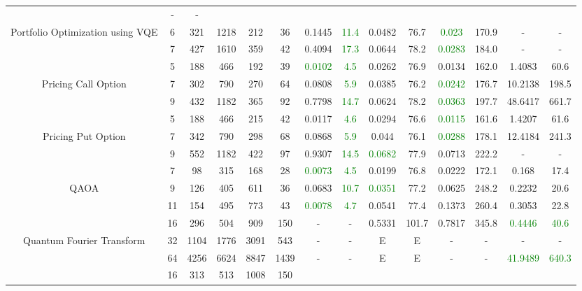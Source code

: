 \begin{table}[htb]
{\begin{tabular}{|c|c|c|c|c|c|c|c|c|c|c|c|c|c|}
 & - & -
 \\
Portfolio Optimization using VQE & 
6 & 321 & 1218 & 212 & 36
 & 0.1445 & \textcolor{green}{11.4}
 & 0.0482 & 76.7
 & \textcolor{green}{0.023} & 170.9
 & - & -
 \\
 & 
7 & 427 & 1610 & 359 & 42
 & 0.4094 & \textcolor{green}{17.3}
 & 0.0644 & 78.2
 & \textcolor{green}{0.0283} & 184.0
 & - & -
 \\
\hline
 & 
5 & 188 & 466 & 192 & 39
 & \textcolor{green}{0.0102} & \textcolor{green}{4.5}
 & 0.0262 & 76.9
 & 0.0134 & 162.0
 & 1.4083 & 60.6
 \\
Pricing Call Option & 
7 & 302 & 790 & 270 & 64
 & 0.0808 & \textcolor{green}{5.9}
 & 0.0385 & 76.2
 & \textcolor{green}{0.0242} & 176.7
 & 10.2138 & 198.5
 \\
 & 
9 & 432 & 1182 & 365 & 92
 & 0.7798 & \textcolor{green}{14.7}
 & 0.0624 & 78.2
 & \textcolor{green}{0.0363} & 197.7
 & 48.6417 & 661.7
 \\
\hline
 & 
5 & 188 & 466 & 215 & 42
 & 0.0117 & \textcolor{green}{4.6}
 & 0.0294 & 76.6
 & \textcolor{green}{0.0115} & 161.6
 & 1.4207 & 61.6
 \\
Pricing Put Option & 
7 & 342 & 790 & 298 & 68
 & 0.0868 & \textcolor{green}{5.9}
 & 0.044 & 76.1
 & \textcolor{green}{0.0288} & 178.1
 & 12.4184 & 241.3
 \\
 & 
9 & 552 & 1182 & 422 & 97
 & 0.9307 & \textcolor{green}{14.5}
 & \textcolor{green}{0.0682} & 77.9
 & 0.0713 & 222.2
 & - & -
 \\
\hline
 & 
7 & 98 & 315 & 168 & 28
 & \textcolor{green}{0.0073} & \textcolor{green}{4.5}
 & 0.0199 & 76.8
 & 0.0222 & 172.1
 & 0.168 & 17.4
 \\
QAOA & 
9 & 126 & 405 & 611 & 36
 & 0.0683 & \textcolor{green}{10.7}
 & \textcolor{green}{0.0351} & 77.2
 & 0.0625 & 248.2
 & 0.2232 & 20.6
 \\
 & 
11 & 154 & 495 & 773 & 43
 & \textcolor{green}{0.0078} & \textcolor{green}{4.7}
 & 0.0541 & 77.4
 & 0.1373 & 260.4
 & 0.3053 & 22.8
 \\
\hline
 & 
16 & 296 & 504 & 909 & 150
 & - & -
 & 0.5331 & 101.7
 & 0.7817 & 345.8
 & \textcolor{green}{0.4446} & \textcolor{green}{40.6}
 \\
Quantum Fourier Transform & 
32 & 1104 & 1776 & 3091 & 543
 & - & -
 & E & E
 & - & -
 & - & -
 \\
 & 
64 & 4256 & 6624 & 8847 & 1439
 & - & -
 & E & E
 & - & -
 & \textcolor{green}{41.9489} & \textcolor{green}{640.3}
 \\
\hline
 & 
16 & 313 & 513 & 1008 & 150

\end{tabular}}
\end{table}
